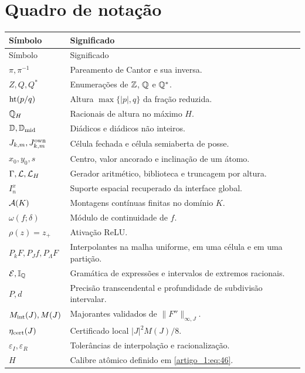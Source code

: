 \section{Quadro de notação}
\footnotesize
\renewcommand{\arraystretch}{1.1}
\begin{longtable}{@{}p{.28\linewidth}p{.68\linewidth}@{}}
\toprule Símbolo&Significado\\\midrule
\endfirsthead
\toprule Símbolo&Significado\\\midrule
\endhead
\bottomrule\endfoot
$\pi,\pi^{-1}$&Pareamento de Cantor e sua inversa.\\
$Z,Q,Q^*$&Enumerações de $\mathbb Z$, $\mathbb Q$ e $\mathbb Q^*$.\\
$\operatorname{ht}(p/q)$&Altura $\max\{|p|,q\}$ da fração reduzida.\\
$\mathbb Q_H$&Racionais de altura no máximo $H$.\\
$\mathbb D,\mathbb D_{\rm mid}$&Diádicos e diádicos não inteiros.\\
$J_{k,m},J_{k,m}^{\rm own}$&Célula fechada e célula semiaberta de posse.\\
$x_0,y_0,s$&Centro, valor ancorado e inclinação de um átomo.\\
$\Gamma,\mathcal L,\mathcal L_H$&Gerador aritmético, biblioteca e truncagem por altura.\\
$I_n^x$&Suporte espacial recuperado da interface global.\\
$\mathcal A(K)$&Montagens contínuas finitas no domínio $K$.\\
$\omega(f;\delta)$&Módulo de continuidade de $f$.\\
$\rho(z)=z_+$&Ativação ReLU.\\
$P_kF,P_Jf,P_\Lambda F$&Interpolantes na malha uniforme, em uma célula e em uma partição.\\
$\mathcal E,\mathbb I_{\mathbb Q}$&Gramática de expressões e intervalos de extremos racionais.\\
$P,d$&Precisão transcendental e profundidade de subdivisão intervalar.\\
$M_{\rm int}(J),M(J)$&Majorantes validados de $\|F''\|_{\infty,J}$.\\
$\eta_{\rm cert}(J)$&Certificado local $|J|^2M(J)/8$.\\
$\varepsilon_I,\varepsilon_R$&Tolerâncias de interpolação e racionalização.\\
$H$&Calibre atômico definido em \eqref{artigo_1:eq:46}.\\
\end{longtable}
\normalsize
